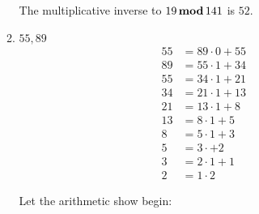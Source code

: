 \documentclass{report}
\newcommand{\mAlign}[1]{\begin{align*}#1\end{align*}}
\newcommand{\defaultEnumerateLabel}{\textbf{\alph*.}}
\newcommand{\modFunc}{\text{\,\textbf{mod}\,}}
\newcommand{\myItem}[1]{\item #1\\}
\begin{document}
\begin{enumerate}[label=\defaultEnumerateLabel]
\begin{enumerate}[label=\defaultEnumerateLabel]
		The multiplicative inverse to $19 \modFunc 141$ is $52$.\\
		
		\myItem{$55,89$}
		
		\mAlign{
			55 &= 89 \cdot 0 + 55 \\
			89 &= 55 \cdot 1 +34 \\
			55 &= 34 \cdot 1 + 21 \\
			34 &= 21 \cdot 1 + 13 \\
			21 &= 13 \cdot 1 + 8 \\
			13 &= 8 \cdot 1 + 5 \\
			8 &= 5 \cdot 1 + 3 \\
			5 &= 3 \cdot + 2 \\
			3 &= 2 \cdot 1 + 1 \\
			2 &= 1 \cdot 2
			}
		
		Let the arithmetic show begin:
		

\end{enumerate}
\end{enumerate}
\end{document}
